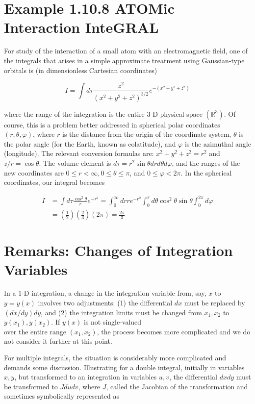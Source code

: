 \documentclass[10pt]{article}
\begin{document}
\section*{Example 1.10.8 ATOMic Interaction InteGRAL}
For study of the interaction of a small atom with an electromagnetic field, one of the integrals that arises in a simple approximate treatment using Gaussian-type orbitals is (in dimensionless Cartesian coordinates)

$$
I=\int d \tau \frac{z^{2}}{\left(x^{2}+y^{2}+z^{2}\right)^{3 / 2}} e^{-\left(x^{2}+y^{2}+z^{2}\right)}
$$

where the range of the integration is the entire 3-D physical space $\left(\mathbb{R}^{3}\right)$. Of course, this is a problem better addressed in spherical polar coordinates $(r, \theta, \varphi)$, where $r$ is the distance from the origin of the coordinate system, $\theta$ is the polar angle (for the Earth, known as colatitude), and $\varphi$ is the azimuthal angle (longitude). The relevant conversion formulas are: $x^{2}+y^{2}+z^{2}=r^{2}$ and $z / r=\cos \theta$. The volume element is $d \tau=r^{2} \sin \theta d r d \theta d \varphi$, and the ranges of the new coordinates are $0 \leq r<\infty, 0 \leq \theta \leq \pi$, and $0 \leq \varphi<2 \pi$. In the spherical coordinates, our integral becomes

$$
\begin{aligned}
I & =\int d \tau \frac{\cos ^{2} \theta}{r} e^{-r^{2}}=\int_{0}^{\infty} d r r e^{-r^{2}} \int_{0}^{\pi} d \theta \cos ^{2} \theta \sin \theta \int_{0}^{2 \pi} d \varphi \\
& =\left(\frac{1}{2}\right)\left(\frac{2}{3}\right)(2 \pi)=\frac{2 \pi}{3}
\end{aligned}
$$

\section*{Remarks: Changes of Integration Variables}
In a 1-D integration, a change in the integration variable from, say, $x$ to $y=y(x)$ involves two adjustments: (1) the differential $d x$ must be replaced by $(d x / d y) d y$, and (2) the integration limits must be changed from $x_{1}, x_{2}$ to $y\left(x_{1}\right), y\left(x_{2}\right)$. If $y(x)$ is not single-valued\\
over the entire range $\left(x_{1}, x_{2}\right)$, the process becomes more complicated and we do not consider it further at this point.

For multiple integrals, the situation is considerably more complicated and demands some discussion. Illustrating for a double integral, initially in variables $x, y$, but transformed to an integration in variables $u, v$, the differential $d x d y$ must be transformed to $J d u d v$, where $J$, called the Jacobian of the transformation and sometimes symbolically represented as
\end{document}
